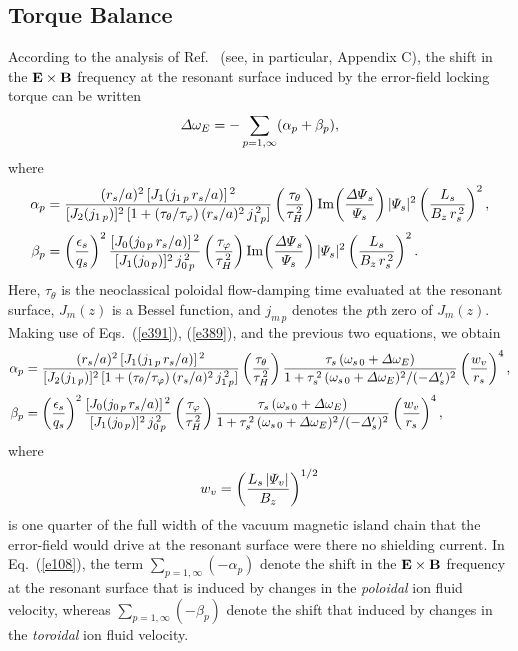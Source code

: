 \documentclass[12pt,prb,aps]{revtex4-1}
\begin{document}
\subsection{Torque Balance}
According to the analysis of Ref.~ (see, in particular, Appendix C), the shift in the ${\bf E}\times{\bf B}$ frequency at the resonant
surface induced by the error-field locking torque can be written
\begin{equation}\label{e108}
{\mit\Delta}\omega_E = -\sum_{p=1,\infty}(\alpha_p + \beta_p),
\end{equation}
where
\begin{align}
\alpha_p &= \frac{(r_s/a)^2\,[J_1(j_{1\,p}\,r_s/a)]^{\,2}}{[J_2(j_{1\,p})]^2\,[1+(\tau_\theta/\tau_\varphi)\,(r_s/a)^2\,j_{1\,p}^{\,2}]}
\left(\frac{\tau_\theta}{\tau_H^{\,2}}\right){\rm Im}\!\left(\frac{{\mit\Delta\Psi}_s}{{\mit\Psi}_s}\right)|{\mit\Psi}_s|^2\left(\frac{L_s}{B_z\,r_s^{\,2}}\right)^2,\\[0.5ex]
\beta_p &= \left(\frac{\epsilon_s}{q_s}\right)^2\frac{[J_0(j_{0\,p}\,r_s/a)]^{\,2}}{[J_1(j_{0\,p})]^2\,j_{0\,p}^{\,2}}\left(\frac{\tau_\varphi}{\tau_H^{\,2}}\right){\rm Im}\!\left(\frac{{\mit\Delta\Psi}_s}{{\mit\Psi}_s}\right)|{\mit\Psi}_s|^2\left(\frac{L_s}{B_z\,r_s^{\,2}}\right)^2
.\label{e110dx}
\end{align}
Here, $\tau_\theta$ is the neoclassical poloidal flow-damping time evaluated at the resonant surface, $J_m(z)$ is a Bessel function, 
and $j_{m\,p}$ denotes the $p$th zero of $J_m(z)$. Making use of Eqs.~(\ref{e391}), (\ref{e389}), and the previous two equations,
we obtain
\begin{align}\label{e109d}
\alpha_p &= \frac{(r_s/a)^2\,[J_1(j_{1\,p}\,r_s/a)]^{\,2}}{[J_2(j_{1\,p})]^2\,[1+(\tau_\theta/\tau_\varphi)\,(r_s/a)^2\,j_{1\,p}^{\,2}]}
\left(\frac{\tau_\theta}{\tau_H^{\,2}}\right)\frac{\tau_s\,(\omega_{s\,0}+{\mit\Delta}\omega_E)}{1+\tau_s^{\,2}\,(\omega_{s\,0}+{\mit\Delta}\omega_E)^2/(-{\mit\Delta}_s')^2}\left(\frac{w_v}{r_s}\right)^4,\\[0.5ex]
\beta_p &= \left(\frac{\epsilon_s}{q_s}\right)^2\frac{[J_0(j_{0\,p}\,r_s/a)]^{\,2}}{[J_1(j_{0\,p})]^2\,j_{0\,p}^{\,2}}
\left(\frac{\tau_\varphi}{\tau_H^{\,2}}\right)\frac{\tau_s\,(\omega_{s\,0}+{\mit\Delta}\omega_E)}{1+\tau_s^{\,2}\,(\omega_{s\,0}+{\mit\Delta}\omega_E)^2/(-{\mit\Delta}_s')^2}\left(\frac{w_v}{r_s}\right)^4,\label{e110d}
\end{align}
where
\begin{equation}
w_v = \left(\frac{L_s\,|{\mit\Psi}_v|}{B_z}\right)^{1/2}
\end{equation}
is one quarter of the full width of the vacuum magnetic island chain that the error-field would drive at the resonant surface were there no
shielding current. In Eq.~(\ref{e108}), the term $\sum_{p=1,\infty}(-\alpha_p)$ denote the shift in the ${\bf E}\times{\bf B}$ frequency at the resonant surface that is
 induced by changes in the {\em poloidal}\/ ion fluid velocity, whereas  $\sum_{p=1,\infty}(-\beta_p)$ denote the shift that induced by  changes in the {\em toroidal}\/  ion fluid velocity. 
\end{document}
